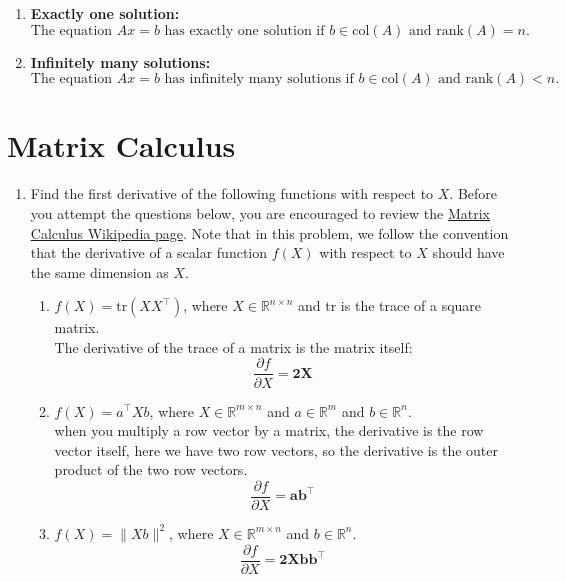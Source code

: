 \documentclass[a3paper,12pt]{extarticle} %
\begin{document}
\begin{enumerate}
\begin{enumerate}
        \item \textbf{Exactly one solution:}
        \[
        \text{The equation } Ax = b \text{ has exactly one solution if } b \in \text{col}(A) \text{ and } \text{rank}(A) = n.
        \]
        
        \item \textbf{Infinitely many solutions:}
        \[
        \text{The equation } Ax = b \text{ has infinitely many solutions if } b \in \text{col}(A) \text{ and } \text{rank}(A) < n. 
        \]
    \end{enumerate}
\end{enumerate}
\newpage
\section{Matrix Calculus}
\begin{enumerate}
    \item Find the first derivative of the following functions with respect to \( X \). Before you attempt the questions below, you are encouraged to review the  \href{https://en.wikipedia.org/wiki/Matrix_calculus}{Matrix Calculus Wikipedia page}. Note that in this problem, we follow the convention that the derivative of a scalar function \( f(X) \) with respect to \( X \) should have the same dimension as \( X \).
    \begin{enumerate}
        \item \( f(X) = \text{tr}(XX^\top) \), where \( X \in \mathbb{R}^{n \times n} \) and \(\text{tr}\) is the trace of a square matrix.
        \\ The derivative of the trace of a matrix is the matrix itself:
        \[
        \frac{\partial f}{\partial X} = \mathbf{2X}
        \]

        \item \( f(X) = a^\top X b \), where \( X \in \mathbb{R}^{m \times n} \) and \( a \in \mathbb{R}^m \) and \( b \in \mathbb{R}^n \).
        \\ when you multiply a row vector by a matrix, the derivative is the row vector itself, here we have two row vectors, so the derivative is the outer product of the two row vectors.
        \[
        \frac{\partial f}{\partial X} = \mathbf{ab^\top}
        \]

        \item \( f(X) = \|Xb\|^2 \), where \( X \in \mathbb{R}^{m \times n} \) and \( b \in \mathbb{R}^n \).
        \[
        \frac{\partial f}{\partial X} = \mathbf{2Xbb^\top}
        \]
    \end{enumerate}
\end{enumerate}
\newpage
\end{document}

